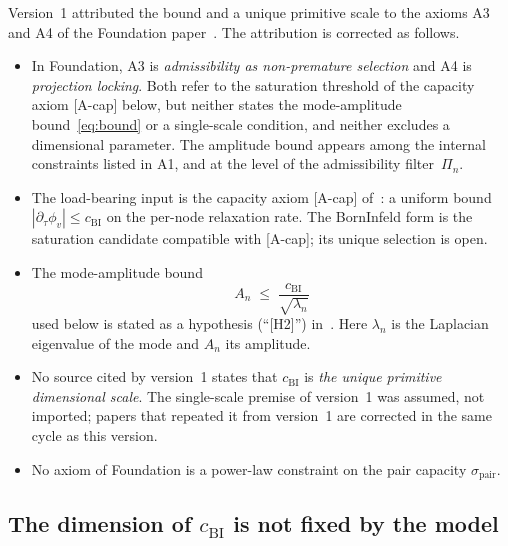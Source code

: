 \documentclass[11pt,a4paper]{article}
\begin{document}
    Version~1 attributed the bound and a unique primitive scale to the axioms A3 and A4 of the Foundation
    paper~\cite{Beau2026m}.
    The attribution is corrected as follows.
    \begin{itemize}
      \item In Foundation, A3 is \emph{admissibility as non-premature selection} and A4 is \emph{projection
        locking}.
        Both refer to the saturation threshold of the capacity axiom [A-cap] below, but neither states the
        mode-amplitude bound~\eqref{eq:bound} or a single-scale condition, and neither excludes a dimensional
        parameter.
        The amplitude bound appears among the internal constraints listed in A1, and at the level of the
        admissibility filter~$\Pi_n$.
      \item The load-bearing input is the capacity axiom [A-cap] of~\cite{Beau2026c}: a uniform bound
        $|\partial_\tau\phi_v|\le c_{\mathrm{BI}}$ on the per-node relaxation rate.
        The Born\textendash Infeld form is the saturation candidate compatible with [A-cap]; its unique selection
        is open.
      \item The mode-amplitude bound
        \begin{equation}
          \label{eq:bound}
          A_n \;\le\; \frac{c_{\mathrm{BI}}}{\sqrt{\lambda_n}}
        \end{equation}
        used below is stated as a hypothesis (``[H2]'') in~\cite{Beau2026a24}.
        Here $\lambda_n$ is the Laplacian eigenvalue of the mode and $A_n$ its amplitude.
      \item No source cited by version~1 states that $c_{\mathrm{BI}}$ is \emph{the unique primitive
        dimensional scale}.
        The single-scale premise of version~1 was assumed, not imported; papers that repeated it from version~1
        are corrected in the same cycle as this version.
      \item No axiom of Foundation is a power-law constraint on the pair capacity $\sigma_{\mathrm{pair}}$.
    \end{itemize}

  \subsection{The dimension of \texorpdfstring{$c_{\mathrm{BI}}$}{c\_BI} is not fixed by the model}
  \label{subsec:dimension}
\end{document}

